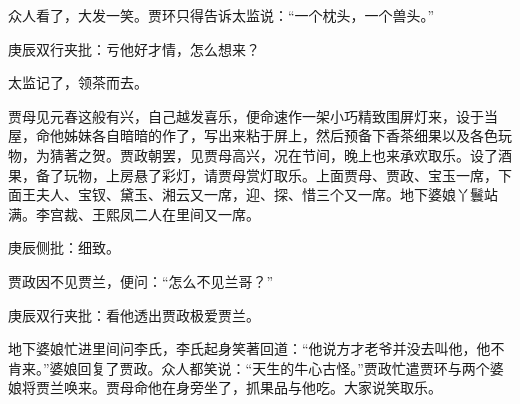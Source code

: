\begin{parag}


    众人看了，大发一笑。贾环只得告诉太监说：“一个枕头，一个兽头。”\begin{note}庚辰双行夹批：亏他好才情，怎么想来？\end{note}太监记了，领茶而去。
\end{parag}


\begin{parag}


    贾母见元春这般有兴，自己越发喜乐，便命速作一架小巧精致围屏灯来，设于当屋，命他姊妹各自暗暗的作了，写出来粘于屏上，然后预备下香茶细果以及各色玩物，为猜著之贺。贾政朝罢，见贾母高兴，况在节间，晚上也来承欢取乐。设了酒果，备了玩物，上房悬了彩灯，请贾母赏灯取乐。上面贾母、贾政、宝玉一席，下面王夫人、宝钗、黛玉、湘云又一席，迎、探、惜三个又一席。地下婆娘丫鬟站满。李宫裁、王熙凤二人在里间又一席。\begin{note}庚辰侧批：细致。\end{note}贾政因不见贾兰，便问：“怎么不见兰哥？”\begin{note}庚辰双行夹批：看他透出贾政极爱贾兰。\end{note}地下婆娘忙进里间问李氏，李氏起身笑著回道：“他说方才老爷并没去叫他，他不肯来。”婆娘回复了贾政。众人都笑说：“天生的牛心古怪。”贾政忙遣贾环与两个婆娘将贾兰唤来。贾母命他在身旁坐了，抓果品与他吃。大家说笑取乐。
\end{parag}


